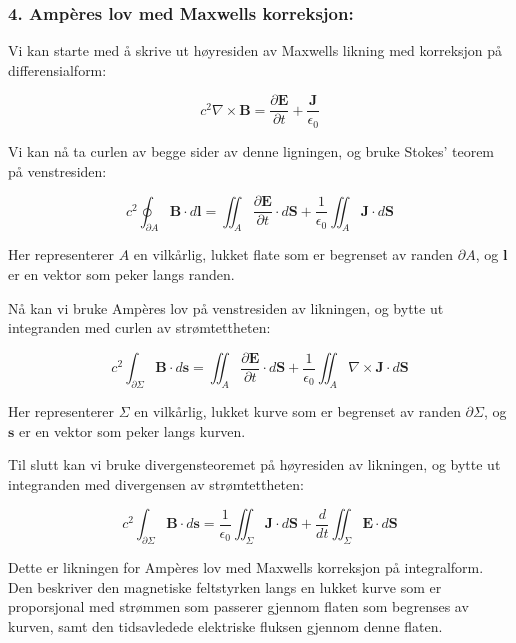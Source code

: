 \subsubsection*{4. Ampères lov med Maxwells korreksjon:}
Vi kan starte med å skrive ut høyresiden av Maxwells likning med korreksjon på differensialform:

\begin{equation*}
    c^{2} \nabla \times \mathbf{B}=\frac{\partial \mathbf{E}}{\partial t}+\frac{\mathbf{J}}{\epsilon_{0}}
\end{equation*}

Vi kan nå ta curlen av begge sider av denne ligningen, og bruke Stokes' teorem på venstresiden:

\begin{equation*}
    c^{2} \oint_{\partial A} \mathbf{B} \cdot d \mathbf{l}=\iint_{A} \frac{\partial \mathbf{E}}{\partial t} \cdot d \mathbf{S}+\frac{1}{\epsilon_{0}} \iint_{A} \mathbf{J} \cdot d \mathbf{S}
\end{equation*}

Her representerer $A$ en vilkårlig, lukket flate som er begrenset av randen $\partial A$, og $\mathbf{l}$ er en vektor som peker langs randen.

Nå kan vi bruke Ampères lov på venstresiden av likningen, og bytte ut integranden med curlen av strømtettheten:

\begin{equation*}
    c^{2} \int_{\partial \Sigma} \mathbf{B} \cdot d \mathbf{s}=\iint_{A} \frac{\partial \mathbf{E}}{\partial t} \cdot d \mathbf{S}+\frac{1}{\epsilon_{0}} \iint_{A} \nabla \times \mathbf{J} \cdot d \mathbf{S}
\end{equation*}

Her representerer $\Sigma$ en vilkårlig, lukket kurve som er begrenset av randen $\partial \Sigma$, og $\mathbf{s}$ er en vektor som peker langs kurven.

Til slutt kan vi bruke divergensteoremet på høyresiden av likningen, og bytte ut integranden med divergensen av strømtettheten:

\begin{equation*}
    c^{2} \int_{\partial \Sigma} \mathbf{B} \cdot d \mathbf{s}=\frac{1}{\epsilon_{0}} \iint_{\Sigma} \mathbf{J} \cdot d \mathbf{S}+\frac{d}{d t} \iint_{\Sigma} \mathbf{E} \cdot d \mathbf{S}
\end{equation*}

Dette er likningen for Ampères lov med Maxwells korreksjon på integralform. Den beskriver den magnetiske feltstyrken langs en lukket kurve som er proporsjonal med strømmen som passerer gjennom flaten som begrenses av kurven, samt den tidsavledede elektriske fluksen gjennom denne flaten.

